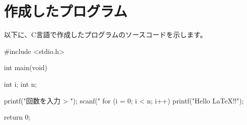 \documentclass{ltjsarticle}
\begin{document}
\section{作成したプログラム}
以下に、C言語で作成したプログラムのソースコードを示します。

#include <stdio.h>

int main(void) {
  int i;
  int n;

  printf("回数を入力 > ");
  scanf("%
  for (i = 0; i < n; i++) {
    printf("Hello LaTeX!!\n");
  }

  return 0;
}
\end{document}
